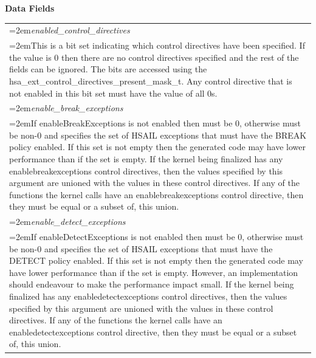 \documentclass[final]{book}
\newcommand{\reffld}[1]{\textit{#1}}
\begin{document}
\noindent\textbf{Data Fields}\\[-6mm]
\begin{longtable}{@{}>{\hangindent=2em}p{\textwidth}}
\reffld{enabled_control_directives}\\\hspace{2em}This is a bit set indicating which control directives have been specified. If the value is 0 then there are no control directives specified and the rest of the fields can be ignored. The bits are accessed using the hsa_ext_control_directives_present_mask_t. Any control directive that is not enabled in this bit set must have the value of all 0s.\\[2mm]
\reffld{enable_break_exceptions}\\\hspace{2em}If enableBreakExceptions is not enabled then must be 0, otherwise must be non-0 and specifies the set of HSAIL exceptions that must have the BREAK policy enabled. If this set is not empty then the generated code may have lower performance than if the set is empty. If the kernel being finalized has any enablebreakexceptions control directives, then the values specified by this argument are unioned with the values in these control directives. If any of the functions the kernel calls have an enablebreakexceptions control directive, then they must be equal or a subset of, this union.\\[2mm]
\reffld{enable_detect_exceptions}\\\hspace{2em}If enableDetectExceptions is not enabled then must be 0, otherwise must be non-0 and specifies the set of HSAIL exceptions that must have the DETECT policy enabled. If this set is not empty then the generated code may have lower performance than if the set is empty. However, an implementation should endeavour to make the performance impact small. If the kernel being finalized has any enabledetectexceptions control directives, then the values specified by this argument are unioned with the values in these control directives. If any of the functions the kernel calls have an enabledetectexceptions control directive, then they must be equal or a subset of, this union.\\[2mm]

\end{longtable}
\end{document}

